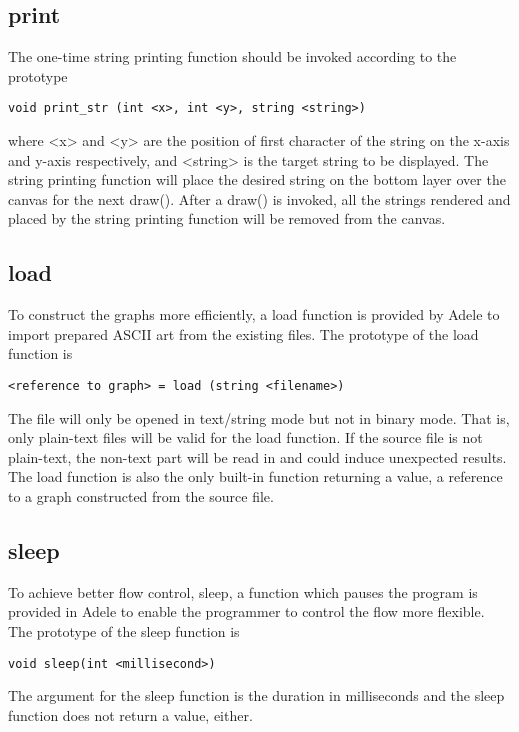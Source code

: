 \documentclass[11pt,letterpaper]{article}
\begin{document}
\subsection {print}
The one-time string printing function should be invoked according to the prototype
\begin{lstlisting}[tabsize=4]
	void print_str (int <x>, int <y>, string <string>)
\end{lstlisting}
where <x> and <y> are the position of first character of the string on the x-axis and y-axis respectively, and <string> is the target string to be displayed. The string printing function will place the desired string on the bottom layer over the canvas for the next draw(). After a draw() is invoked, all the strings rendered and placed by the string printing function will be removed from the canvas.

\subsection {load}
To construct the graphs more efficiently, a load function is provided by Adele to import prepared ASCII art from the existing files. The prototype of the load function is
\begin{lstlisting}[tabsize=4]
	<reference to graph> = load (string <filename>)
\end{lstlisting}	
The file will only be opened in text/string mode but not in binary mode. That is, only plain-text files will be valid for the load function. If the source file is not plain-text, the non-text part will be read in and could induce unexpected results. The load function is also the only built-in function returning a value, a reference to a graph constructed from the source file.

\subsection {sleep}
To achieve better flow control, sleep, a function which pauses the program is provided in Adele to enable the programmer to control the flow more flexible. The prototype of the sleep function is
\begin{lstlisting}[tabsize=4]
	void sleep(int <millisecond>)
\end{lstlisting}	
The argument for the sleep function is the duration in milliseconds and the sleep function does not return a value, either.

\pagebreak
\end{document}
